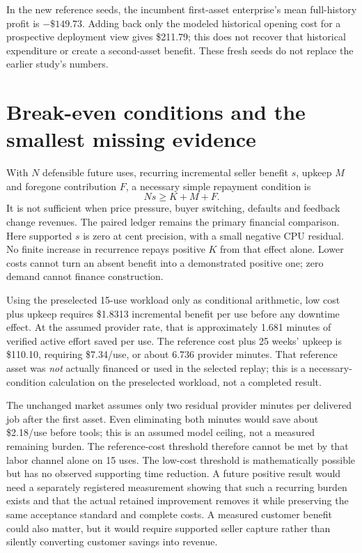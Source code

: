 \documentclass[11pt,letterpaper]{article}
\newcommand{\USD}[1]{\$#1}
\begin{document}
In the new reference seeds, the incumbent first-asset enterprise's mean full-history profit is $-\USD{149.73}$. Adding back only the modeled historical opening cost for a prospective deployment view gives \USD{211.79}; this does not recover that historical expenditure or create a second-asset benefit. These fresh seeds do not replace the earlier study's numbers.

\section{Break-even conditions and the smallest missing evidence}

With $N$ defensible future uses, recurring incremental seller benefit $s$, upkeep $M$ and foregone contribution $F$, a necessary simple repayment condition is
\begin{equation}
Ns\geq K+M+F.
\end{equation}
It is not sufficient when price pressure, buyer switching, defaults and feedback change revenues. The paired ledger remains the primary financial comparison. Here supported $s$ is zero at cent precision, with a small negative CPU residual. No finite increase in recurrence repays positive $K$ from that effect alone. Lower costs cannot turn an absent benefit into a demonstrated positive one; zero demand cannot finance construction.

Using the preselected 15-use workload only as conditional arithmetic, low cost plus upkeep requires \USD{1.8313} incremental benefit per use before any downtime effect. At the assumed provider rate, that is approximately 1.681 minutes of verified active effort saved per use. The reference cost plus 25 weeks' upkeep is \USD{110.10}, requiring \USD{7.34}/use, or about 6.736 provider minutes. That reference asset was \emph{not} actually financed or used in the selected replay; this is a necessary-condition calculation on the preselected workload, not a completed result.

The unchanged market assumes only two residual provider minutes per delivered job after the first asset. Even eliminating both minutes would save about \USD{2.18}/use before tools; this is an assumed model ceiling, not a measured remaining burden. The reference-cost threshold therefore cannot be met by that labor channel alone on 15 uses. The low-cost threshold is mathematically possible but has no observed supporting time reduction. A future positive result would need a separately registered measurement showing that such a recurring burden exists and that the actual retained improvement removes it while preserving the same acceptance standard and complete costs. A measured customer benefit could also matter, but it would require supported seller capture rather than silently converting customer savings into revenue.
\end{document}
